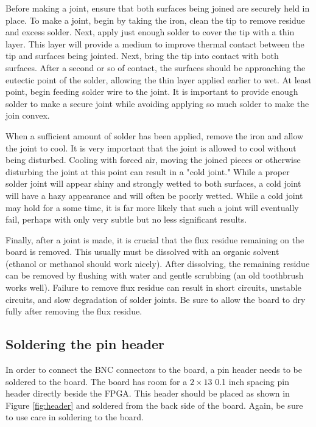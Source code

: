 Before making a joint, ensure that both surfaces being joined are
securely held in place.  To make a joint, begin by taking the iron,
clean the tip to remove residue and excess solder. Next, apply just
enough solder to cover the tip with a thin layer. This layer will
provide a medium to improve thermal contact between the tip and
surfaces being jointed. Next, bring the tip into contact with both
surfaces. After a second or so of contact, the surfaces should be
approaching the eutectic point of the solder, allowing the thin layer
applied earlier to wet. At least point, begin feeding solder wire to
the joint. It is important to provide enough solder to make a secure
joint while avoiding applying so much solder to make the join convex.

When a sufficient amount of solder has been applied, remove the iron
and allow the joint to cool. It is very important that the joint is
allowed to cool without being disturbed. Cooling with forced air,
moving the joined pieces or otherwise disturbing the joint at this
point can result in a "cold joint." While a proper solder joint will
appear shiny and strongly wetted to both surfaces, a cold joint will
have a hazy appearance and will often be poorly wetted. While a cold
joint may hold for a some time, it is far more likely that such a
joint will eventually fail, perhaps with only very subtle but no less
significant results.

Finally, after a joint is made, it is crucial that the flux residue
remaining on the board is removed. This usually must be dissolved with
an organic solvent (ethanol or methanol should work nicely). After
dissolving, the remaining residue can be removed by flushing with
water and gentle scrubbing (an old toothbrush works well). Failure to
remove flux residue can result in short circuits, unstable circuits,
and slow degradation of solder joints. Be sure to allow the board to
dry fully after removing the flux residue.

\subsection{Soldering the pin header}

In order to connect the BNC connectors to the board, a pin header
needs to be soldered to the board. The board has room for a $2 \times
13$ 0.1 inch spacing pin header directly beside the FPGA. This header
should be placed as shown in Figure \ref{fig:header} and soldered from
the back side of the board. Again, be sure to use care in soldering to
the board.

